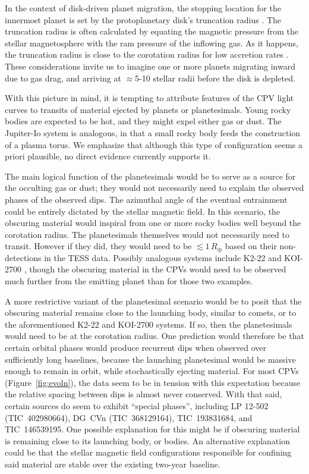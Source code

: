 \documentclass[11pt,twocolumn,tighten,linenumbers]{aastex63}
\begin{document}
In the context of disk-driven planet migration, the stopping location
for the innermost planet is set by the protoplanetary disk's
truncation radius \citep[e.g.][and references
therein]{2018haex.bookE.142I}.  The truncation radius is often
calculated by equating the magnetic pressure from the stellar
magnetosphere with the ram pressure of the inflowing gas.  As it
happens, the truncation radius is close to the corotation radius for
low accretion rates
\citep[e.g.][]{2015SSRv..191..339R,2022MNRAS.510.5246L}.  These
considerations invite us to imagine one or more planets migrating
inward due to gas drag, and arriving at $\approx$5-10 stellar radii
before the disk is depleted.

With this picture in mind, it is tempting to attribute features of the
CPV light curves to transits of material ejected by planets or
planetesimals.  Young rocky bodies are expected to be hot, and they
might expel either gas or dust.  The Jupiter-Io system
\citep[e.g.][]{2004jpsm.book..537S} is analogous, in that a small
rocky body feeds the construction of a plasma torus.  We emphasize
that although this type of configuration seems a priori plausible, no
direct evidence currently supports it.

The main logical function of the planetesimals would be to serve as a
source for the occulting gas or dust; they would not necessarily need
to explain the observed phases of the observed dips.  The azimuthal
angle of the eventual entrainment could be entirely dictated by the
stellar magnetic field.  In this scenario, the obscuring material
would inspiral from one or more rocky bodies well beyond the
corotation radius.  The planetesimals themselves would not necessarily
need to transit.  However if they did, they would need to be $\lesssim
1$\,$R_\oplus$ based on their non-detections in the TESS data.
Possibly analogous systems include K2-22 \citep{2015ApJ...812..112S}
and KOI-2700 \citep{2014ApJ...784...40R}, though the obscuring
material in the CPVs would need to be observed much further from the
emitting planet than for those two examples.  

A more restrictive variant of the planetesimal scenario would be to
posit that the obscuring material remains close to the launching body,
similar to comets, or to the aforementioned K2-22 and KOI-2700
systems.  If so, then the planetesimals would need to be at the
corotation radius.  One prediction would therefore be that certain
orbital phases would produce recurrent dips when observed over
sufficiently long baselines, because the launching planetesimal would
be massive enough to remain in orbit, while stochastically ejecting
material.  For most CPVs (Figure~\ref{fig:evoln}), the data seem to be
in tension with this expectation because the relative spacing between
dips is almost never conserved.  With that said, certain sources do
seem to exhibit ``special phases'', including LP 12-502
(TIC~402980664), DG~CVn (TIC~368129164), TIC~193831684, and
TIC~146539195.  One possible explanation for this might be if
obscuring material is remaining close to its launching body, or
bodies.  An alternative explanation could be that the stellar magnetic
field configurations responsible for confining said material are
stable over the existing two-year baseline.
\end{document}
